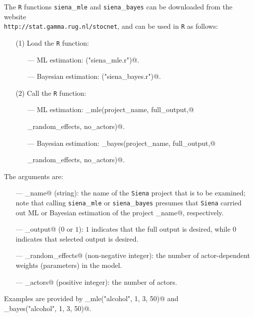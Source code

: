 \documentclass[a4paper,fleqn,11pt]{article}
\newcommand{\+}{\, + \,}
\begin{document}
The {\tt R} functions {\tt siena}\_{\tt mle} and {\tt siena}\_{\tt bayes}
can be downloaded from the website \\
{\tt http://stat.gamma.rug.nl/stocnet},
and can be used in {\tt R} as follows:

\begin{itemize}
\item[(1)] Load the {\tt R} function:
\begin{itemize}
\item[---] ML estimation: \verb@source("siena_mle.r")@.
\item[---] Bayesian estimation: \verb@source("siena_bayes.r")@.
\end{itemize}
\item[(2)] Call the {\tt R} function:
\begin{itemize}
\item[---] ML estimation: \verb@siena_mle(project_name, full_output,@

\verb@no_random_effects, no_actors)@.

\item[---] Bayesian estimation: \verb@siena_bayes(project_name, full_output,@

\verb@no_random_effects, no_actors)@.

\end{itemize}
\end{itemize}

The arguments are:
\begin{itemize}
\item[---] \verb@project_name@ (string): the name of the {\tt Siena} project
that is to be examined;
note that calling {\tt siena}\_{\tt mle} or {\tt siena}\_{\tt bayes} presumes
that {\tt Siena} carried out ML or Bayesian estimation of the
project \verb@project_name@, respectively.
\item[---] \verb@full_output@ ($0$ or $1$): $1$ indicates that the full output is desired,
while $0$ indicates that selected output is desired.
\item[---] \verb@no_random_effects@ (non-negative integer): the number of
actor-dependent weights (parameters) in the model.
\item[---] \verb@no_actors@ (positive integer): the number of actors.
\end{itemize}
Examples are provided by \verb@siena_mle("alcohol", 1, 3, 50)@ and\\
\verb@siena_bayes("alcohol", 1, 3, 50)@.

\fi
\end{document}
